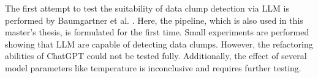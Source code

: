 The first attempt to test the suitability of data clump detection via \ac{LLM} is performed by Baumgartner et al. \cite{electronics13091644}. Here, the pipeline, which is also used in this master's thesis, is formulated for the first time. Small experiments are performed showing that \ac{LLM} are capable of detecting data clumps. However, the refactoring abilities of ChatGPT could not be tested fully. Additionally, the effect of several model parameters like temperature is inconclusive and requires further testing. 